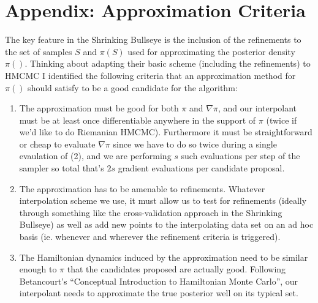 \documentclass[12pt,a4paper]{article}
\begin{document}
\section{Appendix: Approximation Criteria}
The key feature in the Shrinking Bullseye is the inclusion of the refinements to the set of samples $S$ and $\pi(S)$ used for approximating the posterior density $\pi()$.  Thinking about adapting their basic scheme (including the refinements) to HMCMC I identified the following criteria that an approximation method for $\pi()$ should satisfy to be a good candidate for the algorithm:
\begin{enumerate}
\item The approximation must be good for both $\pi$ and $\nabla \pi$, and our interpolant must be at least once differentiable anywhere in the support of $\pi$ (twice if we’d like to do Riemanian HMCMC). Furthermore it must be straightforward or cheap to evaluate $\nabla \pi$ since we have to do so twice during a single evaulation of (2), and we are performing $s$ such evaluations per step of the sampler so total that’s $2s$ gradient evaluations per candidate proposal.
\item The approximation has to be amenable to refinements. Whatever interpolation scheme  we use, it must allow us to test for refinements (ideally through something like the cross-validation approach in the Shrinking Bullseye) as well as add new points to the interpolating data set on an ad hoc basis (ie. whenever and wherever the refinement criteria is triggered).
\item  The Hamiltonian dynamics induced by the approximation  need to be similar enough to $\pi$ that the candidates proposed are actually good. Following Betancourt’s “Conceptual Introduction to Hamiltonian Monte Carlo”, our interpolant needs to approximate the true posterior well on its typical set.
\end{enumerate}

\printbibliography
\end{document}
